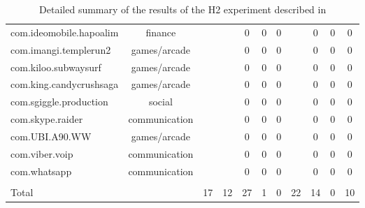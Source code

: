\begin{table*}
\begin{small}
\begin{center}
{\begin{tabular}{|l|c|c||c|c|c|c||c|c|c|c|}
com.ideomobile.hapoalim       						&       finance       &            &            &0&0&0&            &0&0&0\\
com.imangi.templerun2       						&       games/arcade       &            &      \checkmark      &0&0&0&      \checkmark      &0&0&0\\
com.kiloo.subwaysurf       							&       games/arcade       &            &      \checkmark      &0&0&0&      \checkmark      &0&0&0\\
com.king.candycrushsaga       						&       games/arcade       &            &      \checkmark      &0&0&0&      \checkmark      &0&0&0\\
com.sgiggle.production       						&       social       &            &            &0&0&0&            &0&0&0\\
com.skype.raider       								&       communication       &            &            &0&0&0&            &0&0&0\\
com.UBI.A90.WW       								&       games/arcade       &            &            &0&0&0&            &0&0&0\\
com.viber.voip       								&       communication       &            &            &0&0&0&            &0&0&0\\
com.whatsapp         								&       communication       &            &            &0&0&0&            &0&0&0\\
\hline
\hline
 & & & & & & & & & & \\[-0.10in]
Total                &             &      17      &      12      &      27      &      1      &      0      &      22      &      14      &      0      &      10      \\[0.04in]
\hline
\end{tabular}
}%
\end{center}
\vspace{-0.1in}
\caption{\label{Ta:realworldAll}Detailed summary of the results of the H2 experiment described in }
\end{small}
\end{table*} 

